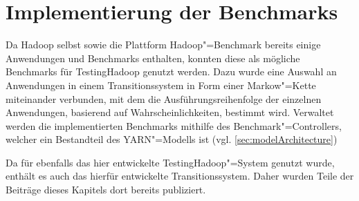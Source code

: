 \chapter{Implementierung der Benchmarks}
\label{ch:benchmarks}

Da Hadoop selbst sowie die Plattform Hadoop"=Benchmark bereits einige Anwendungen und Benchmarks enthalten, konnten diese als mögliche Benchmarks für TestingHadoop genutzt werden.
Dazu wurde eine Auswahl an Anwendungen in einem Transitionssystem in Form einer Markow"=Kette miteinander verbunden, mit dem die Ausführungsreihenfolge der einzelnen Anwendungen, basierend auf Wahrscheinlichkeiten, bestimmt wird.
Verwaltet werden die implementierten Benchmarks mithilfe des Benchmark"=Controllers, welcher ein Bestandteil des YARN"=Modells ist (vgl. \cref{sec:modelArchitecture})

Da für \cite{Eberhardinger2018} ebenfalls das hier entwickelte TestingHadoop"=System genutzt wurde, enthält es auch das hierfür entwickelte Transitionssystem.
Daher wurden Teile der Beiträge dieses Kapitels dort bereits publiziert.





